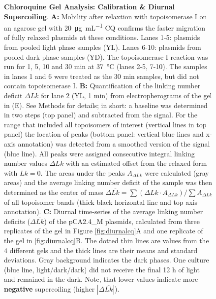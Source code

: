 \documentclass[10pt,a4]{article}
\newcommand{\ugml}{\micro\gram\per\milli\liter}
\begin{document}
\begin{figure}
  \caption{\textbf{Chloroquine Gel Analysis: Calibration \& Diurnal
      Supercoiling}. \small{\textbf{A:} Mobility after relaxtion with
      topoisomerase I on an agarose gel with \SI{20}{\ugml} CQ
      confirms the faster migration of fully relaxed plasmids at these
      conditions. Lanes 1-5: plasmids from pooled light phase samples
      (YL). Lanes 6-10: plasmids from pooled dark phase samples
      (YD). The topoisomerase I reaction was run for 1, 5, 10 and 30
      min at \SI{37}{\celsius} (lanes 2-5, 7-10). The samples in lanes
      1 and 6 were treated as the 30 min samples, but did not contain
      topoisomerase I. \textbf{B:} Quantification of the linking
      number deficit $\Delta Lk$ for lane 2 (YL, 1 min) from
      electropherograms of the gel in (E).  See Methods for details;
      in short: a baseline was determined in two steps (top panel) and
      subtracted from the signal. For the range that included all
      topoisomers of interest (vertical lines in top panel) the
      location of peaks (bottom panel: vertical blue lines and x-axis
      annotation) was detected from a smoothed version of the signal
      (blue line). All peaks were assigned consecutive integral
      linking number values $\Delta Lk$ with an estimated offset from
      the relaxed form with $Lk=0$. The areas under the peaks
      $A_{\Delta Lk}$ were calculated (gray areas) and the average
      linking number deficit of the sample was then determined as the
      center of mass $\Delta \overline{Lk} = \sum{(\Delta Lk \cdot
        A_{\Delta Lk})}/\sum{A_{\Delta Lk}}$ of all topoisomer bands
      (thick black horizontal line and top axis
      annotation). \textbf{C:} Diurnal time-series of the average
      linking number deficits ($\Delta \overline{Lk}$) of the
      pCA2.4\_M plasmids, calculated from three replicates of the gel
      in Figure \ref{fig:diurnalcq}A and one replicate of the gel in
      \ref{fig:diurnalcq}B.  The dotted thin lines are values from
      the 4 different gels and the thick lines are their means and
      standard deviations.  Gray background indicates the dark
      phases. One culture (blue line, light/dark/dark) did not receive
      the final 12 h of light and remained in the dark.  Note, that
      lower values indicate more \textbf{negative} supercoiling
      (higher $|\Delta \overline{Lk}|$).}}
  \label{fig:topoi} 
\end{figure}

   
\end{document}
